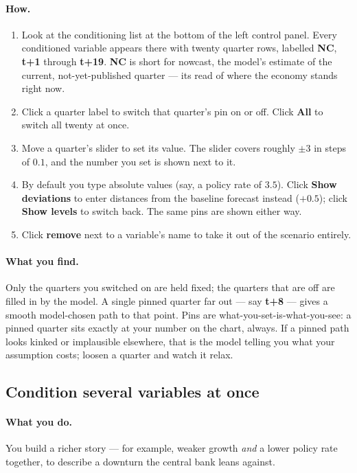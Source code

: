 \documentclass[11pt]{article}
\theoremstyle{definition}
\theoremstyle{remark}
\begin{document}
\paragraph{How.}
\begin{enumerate}
  \item Look at the conditioning list at the bottom of the left control panel. Every
    conditioned variable appears there with twenty quarter rows, labelled
    \textbf{NC}, \textbf{t+1} through \textbf{t+19}. \textbf{NC} is short for
    nowcast, the model's estimate of the current, not-yet-published quarter --- its
    read of where the economy stands right now.
  \item Click a quarter label to switch that quarter's pin on or off. Click
    \textbf{All} to switch all twenty at once.
  \item Move a quarter's slider to set its value. The slider covers roughly
    $\pm 3$ in steps of $0.1$, and the number you set is shown next to it.
  \item By default you type absolute values (say, a policy rate of $3.5$). Click
    \textbf{Show deviations} to enter distances from the baseline forecast instead
    ($+0.5$); click \textbf{Show levels} to switch back. The same pins are shown
    either way.
  \item Click \textbf{remove} next to a variable's name to take it out of the
    scenario entirely.
\end{enumerate}

\paragraph{What you find.} Only the quarters you switched on are held fixed; the
quarters that are off are filled in by the model. A single pinned quarter far out
--- say \textbf{t+8} --- gives a smooth model-chosen path to that point. Pins are
what-you-set-is-what-you-see: a pinned quarter sits exactly at your number on the
chart, always. If a pinned path looks kinked or implausible elsewhere, that is the
model telling you what your assumption costs; loosen a quarter and watch it relax.

\subsection{Condition several variables at once}

\paragraph{What you do.} You build a richer story --- for example, weaker growth
\emph{and} a lower policy rate together, to describe a downturn the central bank
leans against.
\end{document}

